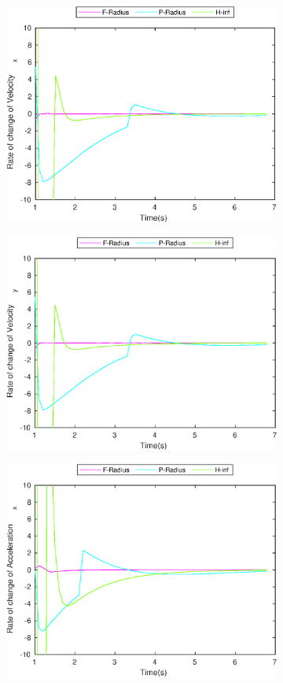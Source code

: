 \begin{figure}[h]
\begin{subfigure}{.5\linewidth}
\includegraphics[width=.9\linewidth]{figures/BoundChange/CA/ca_bound_changeVelocity_x}
\end{subfigure}
\begin{subfigure}{.5\linewidth}
\centering
\includegraphics[width=.9\linewidth]{figures/BoundChange/CA/ca_bound_changeVelocity_y}
\end{subfigure}
\begin{subfigure}{.5\linewidth}
\centering
\includegraphics[width=.9\linewidth]{figures/BoundChange/CA/ca_bound_changeAcceleration_x}

\end{subfigure}
\end{figure}
